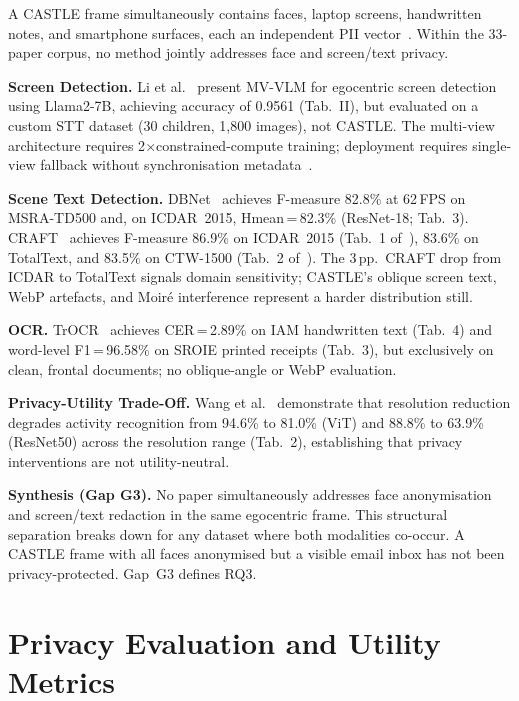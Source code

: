 \documentclass[10pt, twocolumn]{IEEEtran}
\begin{document}
A CASTLE frame simultaneously contains faces, laptop screens, handwritten notes, and smartphone surfaces, each an independent PII vector~\cite{rossetto2025castle}. Within the 33-paper corpus, no method jointly addresses face and screen/text privacy.

\textbf{Screen Detection.} Li et al.~\cite{li2026screen} present MV-VLM for egocentric screen detection using Llama2-7B, achieving accuracy of 0.9561 (Tab.~II), but evaluated on a custom STT dataset (30 children, 1,800 images), not CASTLE. The multi-view architecture requires 2$\times$constrained-compute training; deployment requires single-view fallback without synchronisation metadata~\cite{li2026screen}.

\textbf{Scene Text Detection.} DBNet~\cite{liao2020dbnet} achieves F-measure 82.8\% at 62\,FPS on MSRA-TD500 and, on ICDAR~2015, Hmean\,=\,82.3\% (ResNet-18; Tab.~3). CRAFT~\cite{baek2019craft} achieves F-measure 86.9\% on ICDAR~2015 (Tab.~1 of~\cite{baek2019craft}), 83.6\% on TotalText, and 83.5\% on CTW-1500 (Tab.~2 of~\cite{baek2019craft}). The 3\,pp.\ CRAFT drop from ICDAR to TotalText signals domain sensitivity; CASTLE's oblique screen text, WebP artefacts, and Moir\'e interference represent a harder distribution still.

\textbf{OCR.} TrOCR~\cite{li2023trocr} achieves CER\,=\,2.89\% on IAM handwritten text (Tab.~4) and word-level F1\,=\,96.58\% on SROIE printed receipts (Tab.~3), but exclusively on clean, frontal documents; no oblique-angle or WebP evaluation.

\textbf{Privacy-Utility Trade-Off.} Wang et al.~\cite{wang2023modeling} demonstrate that resolution reduction degrades activity recognition from 94.6\% to 81.0\% (ViT) and 88.8\% to 63.9\% (ResNet50) across the resolution range (Tab.~2), establishing that privacy interventions are not utility-neutral.

\textbf{Synthesis (Gap G3).} No paper simultaneously addresses face anonymisation and screen/text redaction in the same egocentric frame. This structural separation breaks down for any dataset where both modalities co-occur. A CASTLE frame with all faces anonymised but a visible email inbox has not been privacy-protected. Gap~G3 defines RQ3.

\section{Privacy Evaluation and Utility Metrics}
\label{sec:evaluation}
\end{document}
